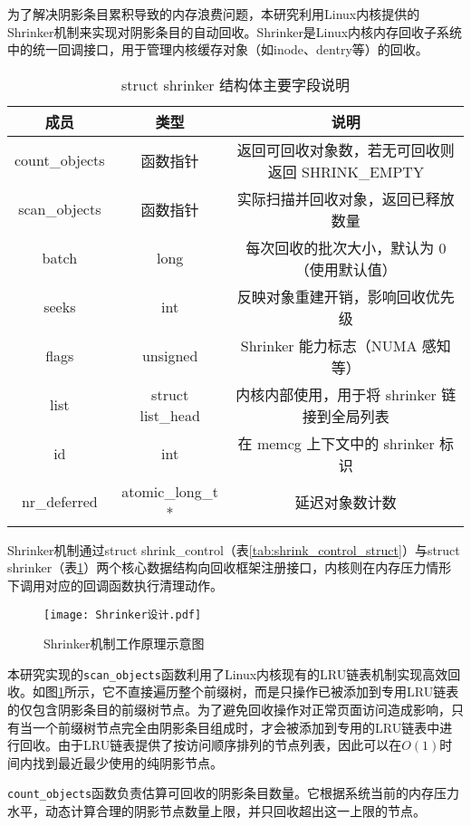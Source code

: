 为了解决阴影条目累积导致的内存浪费问题，本研究利用Linux内核提供的Shrinker机制来实现对阴影条目的自动回收。Shrinker是Linux内核内存回收子系统中的统一回调接口，用于管理内核缓存对象（如inode、dentry等）的回收。
\begin{table}[htbp]
  \centering
  \caption{struct shrinker 结构体主要字段说明}
  \label{tab:shrinker_struct}
  \begin{tabular}{ccc}
    \toprule
    \textbf{成员} & \textbf{类型} & \textbf{说明} \\
    \midrule
    count\_objects & 函数指针 & 返回可回收对象数，若无可回收则返回 SHRINK\_EMPTY \\
    scan\_objects & 函数指针 & 实际扫描并回收对象，返回已释放数量 \\
    batch & long & 每次回收的批次大小，默认为 0（使用默认值） \\
    seeks & int & 反映对象重建开销，影响回收优先级 \\
    flags & unsigned & Shrinker 能力标志（NUMA 感知等） \\
    list & struct list\_head & 内核内部使用，用于将 shrinker 链接到全局列表 \\
    id & int & 在 memcg 上下文中的 shrinker 标识 \\
    nr\_deferred & atomic\_long\_t * & 延迟对象数计数 \\
    \bottomrule
  \end{tabular}
\end{table}
Shrinker机制通过struct shrink\_control（表\ref{tab:shrink_control_struct}）与struct shrinker（表\ref{tab:shrinker_struct}）两个核心数据结构向回收框架注册接口，内核则在内存压力情形下调用对应的回调函数执行清理动作。

\begin{figure}[htbp]
  \centering
  \texttt{[image: Shrinker设计.pdf]}
  \caption{Shrinker机制工作原理示意图}
  \label{fig:shrink}
\end{figure}

本研究实现的\texttt{scan\_objects}函数利用了Linux内核现有的LRU链表机制实现高效回收。如图\ref{fig:shrink}所示，它不直接遍历整个前缀树，而是只操作已被添加到专用LRU链表的仅包含阴影条目的前缀树节点。为了避免回收操作对正常页面访问造成影响，只有当一个前缀树节点完全由阴影条目组成时，才会被添加到专用的LRU链表中进行回收。由于LRU链表提供了按访问顺序排列的节点列表，因此可以在\(O(1)\)时间内找到最近最少使用的纯阴影节点。

\texttt{count\_objects}函数负责估算可回收的阴影条目数量。它根据系统当前的内存压力水平，动态计算合理的阴影节点数量上限，并只回收超出这一上限的节点。

